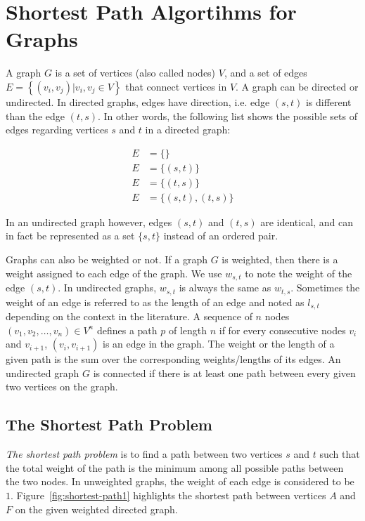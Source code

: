 \section{Shortest Path Algortihms for Graphs}
\label{sec:bkg:graph}
A graph $G$ is a set of vertices (also called nodes) $V$, and a set of edges $E=\left\{(v_i, v_j) | v_i, v_j \in V\right\}$ that connect vertices in $V$. A graph can be directed or undirected. In directed graphs, edges have direction, i.e. edge $(s, t)$ is different than the edge $(t, s)$. In other words, the following list shows the possible sets of edges regarding vertices $s$ and $t$ in a directed graph:

\begin{align}
  E &= \{\} \nonumber \\
  E &= \{(s, t)\} \nonumber \\
  E &= \{(t, s)\} \nonumber \\
  E &= \{(s, t), (t, s)\}
\end{align}

In an undirected graph however, edges $(s, t)$ and $(t, s)$ are identical, and can in fact be represented as a set $\{s, t\}$ instead of an ordered pair.

Graphs can also be weighted or not. If a graph $G$ is weighted, then there is a weight assigned to each edge of the graph. We use $w_{s,t}$ to note the weight of the edge $(s,t)$. In undirected graphs, $w_{s, t}$ is always the same as $w_{t, s}$. Sometimes the weight of an edge is referred to as the length of an edge and noted as $l_{s,t}$ depending on the context in the literature. A sequence of $n$ nodes $(v_1, v_2,\ldots,v_n) \in V^n$ defines a path $p$ of length $n$ if for every consecutive nodes $v_i$ and $v_{i+1}$, $(v_i, v_{i+1})$ is an edge in the graph. The weight or the length of a given path is the sum over the corresponding weights/lengths of its edges.
An undirected graph $G$ is connected if there is at least one path between every given two vertices on the graph.

\subsection{The Shortest Path Problem}
\emph{The shortest path problem} is to find a path between two vertices $s$ and $t$ such that the total weight of the path is the minimum among all possible paths between the two nodes. In unweighted graphs, the weight of each edge is considered to be $1$. Figure~\ref{fig:shortest-path1} highlights the shortest path between vertices $A$ and $F$ on the given weighted directed graph.

